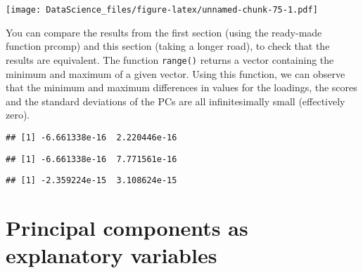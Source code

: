 \documentclass[
]{book}
\newenvironment{Shaded}{\begin{snugshade}}{\end{snugshade}}
\newcommand{\FunctionTok}[1]{\textcolor[rgb]{0.00,0.00,0.00}{#1}}
\newcommand{\NormalTok}[1]{#1}
\newcommand{\SpecialCharTok}[1]{\textcolor[rgb]{0.00,0.00,0.00}{#1}}
\begin{document}
\texttt{[image: DataScience\_files/figure-latex/unnamed-chunk-75-1.pdf]}

You can compare the results from the first section (using the ready-made function prcomp) and this section (taking a longer road), to check that the results are equivalent. The function \texttt{range()} returns a vector containing the minimum and maximum of a given vector. Using this function, we can observe that the minimum and maximum differences in values for the loadings, the scores and the standard deviations of the PCs are all infinitesimally small (effectively zero).

\begin{Shaded}
\end{Shaded}

\begin{verbatim}
## [1] -6.661338e-16  2.220446e-16
\end{verbatim}

\begin{Shaded}
\end{Shaded}

\begin{verbatim}
## [1] -6.661338e-16  7.771561e-16
\end{verbatim}

\begin{Shaded}
\end{Shaded}

\begin{verbatim}
## [1] -2.359224e-15  3.108624e-15
\end{verbatim}

\hypertarget{principal-components-as-explanatory-variables}{%
\section{Principal components as explanatory variables}\label{principal-components-as-explanatory-variables}}
\end{document}
